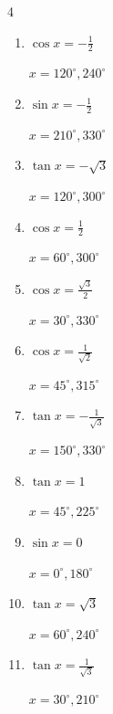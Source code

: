 \begin{multicols}{4}
\begin{enumerate}
        $\displaystyle x = 150^{\circ} , 330^{\circ}$

  \item $\displaystyle \cos{x}  = -\frac{1}{2}$

        $\displaystyle x = 120^{\circ} , 240^{\circ}$

  \item $\displaystyle \sin{x}  = -\frac{1}{2}$

        $\displaystyle x = 210^{\circ} , 330^{\circ}$

\columnbreak %

  \item $\displaystyle \tan{x}  = -\sqrt{3}$

        $\displaystyle x = 120^{\circ} , 300^{\circ}$

  \item $\displaystyle \cos{x}  = \frac{1}{2}$

        $\displaystyle x = 60^{\circ} , 300^{\circ}$

  \item $\displaystyle \cos{x}  = \frac{\sqrt{3}}{2}$

        $\displaystyle x = 30^{\circ} , 330^{\circ}$

  \item $\displaystyle \cos{x}  = \frac{1}{\sqrt{2}}$

        $\displaystyle x = 45^{\circ} , 315^{\circ}$

  \item $\displaystyle \tan{x}  = -\frac{1}{\sqrt{3}}$

        $\displaystyle x = 150^{\circ} , 330^{\circ}$

  \item $\displaystyle \tan{x}  = 1$

        $\displaystyle x = 45^{\circ} , 225^{\circ}$

  \item $\displaystyle \sin{x}  = 0$

        $\displaystyle x = 0^{\circ} , 180^{\circ}$

  \item $\displaystyle \tan{x}  = \sqrt{3}$

        $\displaystyle x = 60^{\circ} , 240^{\circ}$

  \item $\displaystyle \tan{x}  = \frac{1}{\sqrt{3}}$

        $\displaystyle x = 30^{\circ} , 210^{\circ}$


\end{enumerate}
\end{multicols}
